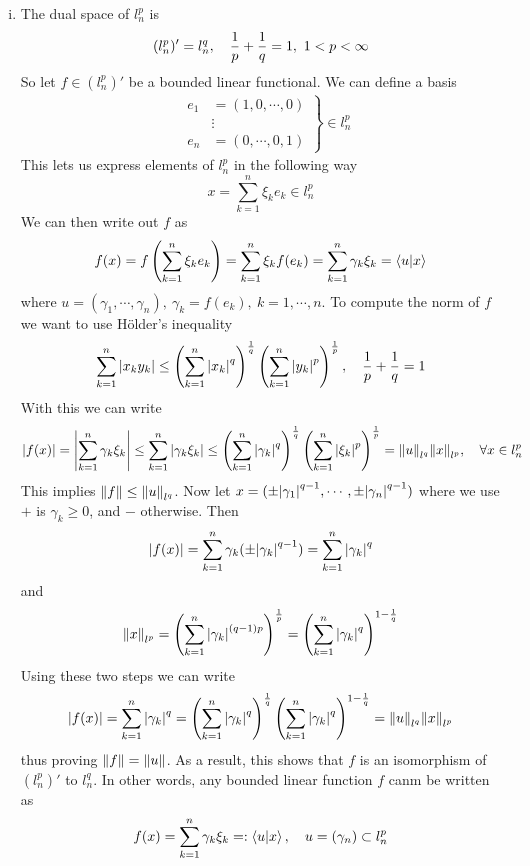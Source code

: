 \documentclass[../../script.tex]{subfiles}
\begin{document}
\begin{eg}
    \begin{enumerate}[(i)]
        \item The dual space of $l_n^p$ is
        \[
            (l_n^p)' = l_n^q, \quad \frac{1}{p} + \frac{1}{q} = 1, ~1 < p <\infty
        \]
        So let $f \in (l_n^p)'$ be a bounded linear functional. We can define a basis 
        \begin{align*}
            &\left. \begin{aligned}
                e_1 &= (1, 0, \cdots, 0) \\ 
                &\vdots \\
                e_n &= (0, \cdots, 0, 1)
            \end{aligned} \right\} \in l_n^p
        \end{align*}
        This lets us express elements of $l_n^p$ in the following way
        \[
            x = \sum_{k=1}^n \xi_k e_k \in l_n^p
        \]
        We can then write out $f$ as 
        \[
            f(x) = f\left(\sum_{k=1}^n \xi_k e_k\right) = \sum_{k=1}^n \xi_k f(e_k) = \sum_{k=1}^{n} \gamma_k \xi_k = \innerproduct{u}{x}
        \]
        where $u = (\gamma_1, \cdots, \gamma_n), ~\gamma_k = f(e_k), ~k = 1, \cdots, n$. To compute the norm of $f$ we want to use Hölder's inequality
        \[
            \sum_{k=1}^n \abs{x_k y_k} \le \left(\sum_{k=1}^n \abs{x_k}^q \right)^{\frac{1}{q}} \left(\sum_{k=1}^n \abs{y_k}^p \right)^{\frac{1}{p}}, \quad \frac{1}{p} + \frac{1}{q} = 1
        \]
        With this we can write
        \[
            \abs{f(x)} = \abs{\sum_{k=1}^n \gamma_k \xi_k} \le \sum_{k=1}^n \abs{\gamma_k \xi_k} \le \left(\sum_{k=1}^n \abs{\gamma_k}^q \right)^{\frac{1}{q}} \left(\sum_{k=1}^n \abs{\xi_k}^p \right)^{\frac{1}{p}} = \norm{u}_{l^q} \norm{x}_{l^p}, \quad \forall x \in l_n^p
        \]
        This implies $\norm{f} \le \norm{u}_{l^q}$. Now let $x = (\pm \abs{\gamma_1}^{q-1}, \cdots, \pm \abs{\gamma_n}^{q-1})$ where we use $+$ is $\gamma_k \ge 0$, and $-$ otherwise.
        Then 
        \[
            \abs{f(x)} = \sum_{k=1}^n \gamma_k (\pm \abs{\gamma_k}^{q-1}) = \sum_{k=1}^n \abs{\gamma_k}^q
        \]
        and 
        \[
            \norm{x}_{l^p} = \left(\sum_{k=1}^n \abs{\gamma_k}^{(q-1)p}\right)^{\frac{1}{p}} = \left(\sum_{k=1}^n \abs{\gamma_k}^q\right)^{1-\frac{1}{q}}
        \]
        Using these two steps we can write 
        \[
            \abs{f(x)} = \sum_{k=1}^n \abs{\gamma_k}^q = \left(\sum_{k=1}^n \abs{\gamma_k}^q \right)^{\frac{1}{q}} \left(\sum_{k=1}^n \abs{\gamma_k}^q \right)^{1 - \frac{1}{q}} = \norm{u}_{l^q} \norm{x}_{l^p}
        \]
        thus proving $\norm{f} = \norm{u}$. As a result, this shows that $f$ is an isomorphism of $(l_n^p)'$ to $l_n^q$. 
        In other words, any bounded linear function $f$ canm be written as 
        \[
            f(x) = \sum_{k=1}^n \gamma_k \xi_k =: \innerproduct{u}{x}, \quad u = \anyseqdef[\gamma]{l_n^p}
        \]


\end{enumerate}
\end{eg}
\end{document}

